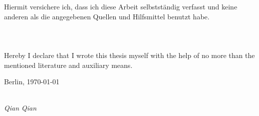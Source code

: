 \newpage

\thispagestyle{empty}

\begin{large}

\vspace*{6cm}

\noindent
Hiermit versichere ich, dass ich diese Arbeit selbstst\"andig verfasst und keine anderen als die
angegebenen Quellen und Hilfsmittel benutzt habe.
\\\\\\\\
Hereby I declare that I wrote this thesis myself with the help of no more than the mentioned literature and auxiliary means.
\vspace{2cm}

\noindent
Berlin, \today

\vspace{3cm}

\hspace*{5cm}%
\dotfill\\
\hspace*{6.1cm}%
\textit{Qian Qian}

\end{large}
